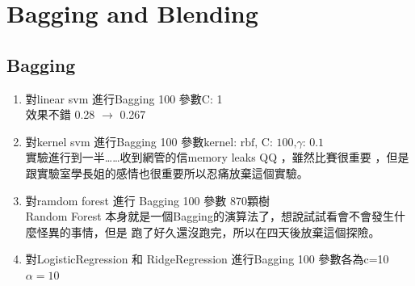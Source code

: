 \documentclass[12pt]{article}
\theoremstyle{definition}
\theoremstyle{remark}
\begin{document}
\section{Bagging and Blending}
\subsection{Bagging}
\begin{enumerate}
  \item 對linear svm 進行Bagging 100 參數C: 1 \\
    效果不錯 0.28 $ \to $ 0.267
  \item 對kernel svm 進行Bagging 100  參數$ \text{kernel: rbf, C: 100,} \gamma \text{: 0.1} $\\
    實驗進行到一半\dots\dots 收到網管的信memory leaks QQ ，雖然比賽很重要
    ，但是跟實驗室學長姐的感情也很重要所以忍痛放棄這個實驗。
  \item 對ramdom forest 進行 Bagging 100 參數 870顆樹\\
    Random Forest 本身就是一個Bagging的演算法了，想說試試看會不會發生什麼怪異的事情，但是
    跑了好久還沒跑完，所以在四天後放棄這個探險。
  \item 對LogisticRegression 和 RidgeRegression 進行Bagging 100 參數各為c=10 $ \alpha = 10$
\end{enumerate}
\end{document}
